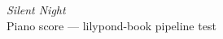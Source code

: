 \documentclass[letterpaper,11pt]{article}
\begin{document}
\begin{center}{\Large\itshape Silent Night}\\[2mm]
{\small\ttfamily Piano score — lilypond-book pipeline test}\end{center}

\vspace{4mm}

\begin{quote}
{%
\parindent 0pt
\noindent
\ifx\preLilyPondExample \undefined
\else
  \expandafter\preLilyPondExample
\fi
\def\lilypondbook{}%

\ifx\postLilyPondExample \undefined
\else
  \expandafter\postLilyPondExample
\fi
}
\end{quote}
\end{document}
